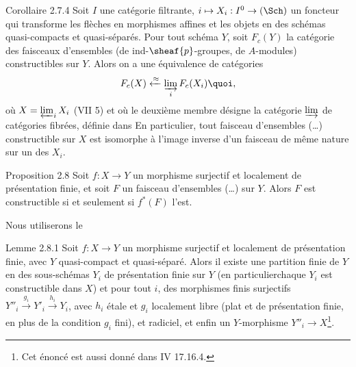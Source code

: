 \documentclass[10pt]{../fichiers-configuration-latex/smfart}
\begin{document}
\begin{enonce*}{Corollaire 2.7.4}
Soit $I$ une catégorie filtrante, $i\mapsto X_i:I^0\rightarrow (\Sch)$
un foncteur qui transforme les flèches en morphismes affines et les
objets en des schémas quasi-compacts et quasi-séparés. Pour tout
schéma $Y$, soit $F_{c}(Y)$ la catégorie des faisceaux d'ensembles
(\resp de ind-$\sheaf{p}$-groupes, \resp de $A$-modules) constructibles
sur $Y$. Alors on a une équivalence de catégories
$$
F_{c}(X)\xleftarrow{\approx}\varinjlim_i F_{c}(X_i){\quoi},
$$
où $X=\varprojlim_i X_i$ {\rm (VII 5)} et où le deuxième membre
désigne la catégorie $\varinjlim$ de catégories fibrées, définie dans\hspace{1cm}
En particulier, tout faisceau d'ensembles (\resp\ldots) constructible
sur $X$ est isomorphe à l'image inverse d'un faisceau de même nature
sur un des $X_i$.
\end{enonce*}

\begin{enonce*}{Proposition 2.8}
Soit $f:X\rightarrow Y$ un morphisme surjectif et localement de
présentation finie, et soit $F$ un faisceau d'ensembles (\resp\ldots)
sur $Y$. Alors $F$ est constructible si et seulement si $f^{\ast}(F)$ l'est.
\end{enonce*}

Nous utiliserons le

\begin{enonce*}{Lemme 2.8.1}
Soit $f:X\rightarrow Y$ un morphisme surjectif et localement de
présentation finie, avec $Y$ quasi-compact et quasi-séparé. Alors il
existe une partition finie de $Y$ en des sous-schémas $Y_i$ de
présentation finie sur $Y$ (en particulier\pageoriginale chaque $Y_i$
est constructible dans $X$) et pour tout $i$, des morphismes finis
surjectifs $Y''_i\xrightarrow{g_i}Y'_i\xrightarrow{h_i}Y_i$, avec
$h_i$ étale et $g_i$ localement libre (\ie plat et de présentation
finie, en plus de la condition $g_i$ fini), et radiciel, et enfin un
$Y$-morphisme $Y''_i\rightarrow X$\footnote[1]{Cet énoncé est aussi
  donné dans \EGA IV 17.16.4.}.
\end{enonce*}
\end{document}
